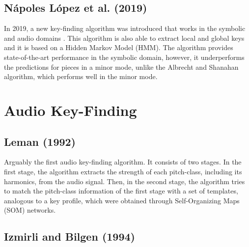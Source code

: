 \subsection{N\'apoles L\'opez et al. (2019)}
In 2019, a new key-finding algorithm was introduced that works in the symbolic and audio domains \cite{napoleslopez2019keyfinding}. This algorithm is also able to extract local and global keys and it is based on a Hidden Markov Model (HMM). The algorithm provides state-of-the-art performance in the symbolic domain, however, it underperforms the predictions for pieces in a minor mode, unlike the Albrecht and Shanahan algorithm, which performs well in the minor mode.

\section{Audio Key-Finding}

\subsection{Leman (1992)}


Arguably the first audio key-finding algorithm. It consists of two stages. In the first stage, the algorithm extracts the strength of each pitch-class, including its harmonics, from the audio signal. Then, in the second stage, the algorithm tries to match the pitch-class information of the first stage with a set of templates, analogous to a key profile, which were obtained through Self-Organizing Maps (SOM) networks. 

\subsection{Izmirli and Bilgen (1994)}

